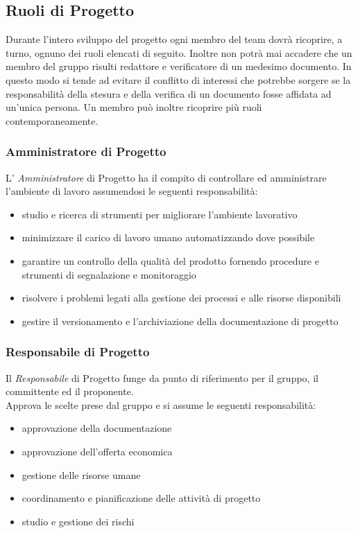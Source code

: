 \subsection{Ruoli di Progetto}

Durante l’intero sviluppo del progetto  ogni membro del team dovrà ricoprire, a
turno, ognuno dei ruoli elencati di seguito.
Inoltre non potrà mai accadere che un membro del gruppo risulti redattore e verificatore di un
medesimo documento. In questo modo si tende ad evitare il conflitto di interessi che potrebbe sorgere se la responsabilità della stesura e della verifica di un documento fosse affidata ad
un’unica persona. Un membro può inoltre ricoprire più ruoli contemporaneamente.

\subsubsection{Amministratore di Progetto} 
L' \emph{Amministratore}  di Progetto ha il compito di controllare ed
amministrare l'ambiente di lavoro assumendosi le seguenti
responsabilità: 
\begin{itemize}
	\item studio e ricerca di strumenti per migliorare l'ambiente lavorativo
	\item minimizzare il carico di lavoro umano automatizzando dove possibile
	\item garantire un controllo della qualità del prodotto fornendo procedure e strumenti di segnalazione e monitoraggio
	\item risolvere i problemi legati alla gestione dei processi e alle risorse disponibili
	\item gestire il versionamento e l'archiviazione della documentazione di progetto
\end{itemize}
\subsubsection{Responsabile  di Progetto}
Il  \emph{Responsabile}  di Progetto funge da punto di riferimento per
il gruppo, il committente ed il proponente.\\ Approva
le scelte prese dal gruppo e si assume le seguenti responsabilità: 
\begin{itemize}
	\item approvazione della documentazione
	\item approvazione dell'offerta economica
	\item gestione delle risorse umane
	\item coordinamento e pianificazione delle attività di progetto
	\item studio e gestione dei rischi
\end{itemize}
